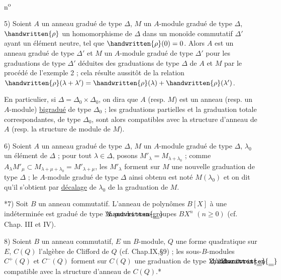 \begin{flushright}
n\textsuperscript{o}
\end{flushright}

5) Soient $A$ un anneau gradué de type $\Delta$, $M$ un $A$-module gradué de type $\Delta$, $\handwritten{\rho}$ un homomorphisme de $\Delta$ dans un monoïde commutatif $\Delta'$ ayant un élément neutre, tel que $\handwritten{\rho}(0)=0$. Alors $A$ est un anneau gradué de type $\Delta'$ et $M$ un $A$-module gradué de type $\Delta'$ pour les graduations de type $\Delta'$ déduites des graduations de type $\Delta$ de $A$ et $M$ par le procédé de l'exemple 2 ; cela résulte aussitôt de la relation $\handwritten{\rho}(\lambda+\lambda')=\handwritten{\rho}(\lambda)+\handwritten{\rho}(\lambda')$.

En particulier, si $\Delta=\Delta_0\times\Delta_0$, on dira que $A$ (resp. $M$) est un anneau (resp. un $A$-module) \uline{bigradué} de type $\Delta_0$ ; les graduations partielles et la graduation totale correspondantes, de type $\Delta_0$, sont alors compatibles avec la structure d'anneau de $A$ (resp. la structure de module de $M$).

6) Soient $A$ un anneau gradué de type $\Delta$, $M$ un $A$-module gradué de type $\Delta$, $\lambda_0$ un élément de $\Delta$ ; pour tout $\lambda\in\Delta$, posons $M'_\lambda=M_{\lambda+\lambda_0}$ ; comme $A_\lambda M'_\mu\subset M_{\lambda+\mu+\lambda_0}=M'_{\lambda+\mu}$, les $M'_\lambda$ forment sur $M$ une nouvelle graduation de type $\Delta$ ; le $A$-module gradué de type $\Delta$ ainsi obtenu est noté $M(\lambda_0)$ et on dit qu'il s'obtient par \uline{décalage} de $\lambda_0$ de la graduation de $M$.

*7) Soit $B$ un anneau commutatif. L'anneau de polynômes $B[X]$ à une indéterminée est gradué de type $\rlap{\ensuremath{\handwritten{\underline{\underline{\phantom{N}}}}}}N$ par les sous-groupes $BX^n$ $(n\geq 0)$ (cf. Chap. III et IV).

8) Soient $B$ un anneau commutatif, $E$ un $B$-module, $Q$ une forme quadratique sur $E$, $C(Q)$ l'algèbre de Clifford de $Q$ (cf. Chap.IX,\S{}9) ; les sous-$B$-modules $C^+(Q)$ et $C^-(Q)$ forment sur $C(Q)$ une graduation de type $\rlap{\ensuremath{\handwritten{\underline{\underline{\phantom{Z}}}}}}Z/2\rlap{\ensuremath{\handwritten{\underline{\underline{\phantom{Z}}}}}}Z$ compatible avec la structure d'anneau de $C(Q)$.*

